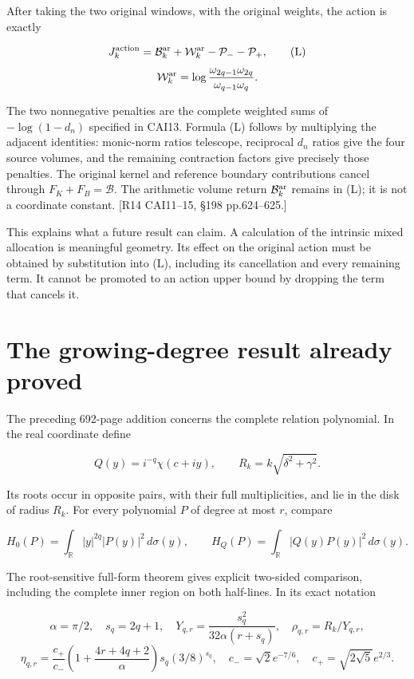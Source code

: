 After taking the two original windows, with the original weights, the action is exactly

\[
J_k^{\rm action}
=\mathcal B_k^{\rm ar}+\mathcal W_k^{\rm ar}
 -\mathcal P_- -\mathcal P_+,
\tag{L}
\] \[
\mathcal W_k^{\rm ar}
=\log\frac{\omega_{2q-1}\omega_{2q}}{\omega_{q-1}\omega_q}.
\]

The two nonnegative penalties are the complete weighted sums of \(-\log(1-d_n)\) specified in CAI13. Formula (L) follows by multiplying the adjacent identities: monic-norm ratios telescope, reciprocal \(d_n\) ratios give the four source volumes, and the remaining contraction factors give precisely those penalties. The original kernel and reference boundary contributions cancel through \(F_K+F_B=\mathcal B\). The arithmetic volume return \(\mathcal B_k^{\rm ar}\) remains in (L); it is not a coordinate constant. {[}R14 CAI11--15, §198 pp.624--625.{]}

This explains what a future result can claim. A calculation of the intrinsic mixed allocation is meaningful geometry. Its effect on the original action must be obtained by substitution into (L), including its cancellation and every remaining term. It cannot be promoted to an action upper bound by dropping the term that cancels it.

\section{The growing-degree result already proved}\label{the-growing-degree-result-already-proved}

The preceding 692-page addition concerns the complete relation polynomial. In the real coordinate define

\[
Q(y)=i^{-q}\chi(c+iy),\qquad R_k=k\sqrt{\delta^2+\gamma^2}.
\]

Its roots occur in opposite pairs, with their full multiplicities, and lie in the disk of radius \(R_k\). For every polynomial \(P\) of degree at most \(r\), compare

\[
H_0(P)=\int_{\mathbb R}|y|^{2q}|P(y)|^2\,d\sigma(y),\qquad
H_Q(P)=\int_{\mathbb R}|Q(y)P(y)|^2\,d\sigma(y).
\]

The root-sensitive full-form theorem gives explicit two-sided comparison, including the complete inner region on both half-lines. In its exact notation

\[
\alpha=\pi/2,\quad s_q=2q+1,\quad
Y_{q,r}=\frac{s_q^2}{32\alpha(r+s_q)},\quad
\rho_{q,r}=R_k/Y_{q,r},
\] \[
\eta_{q,r}=\frac{c_+}{c_-}
 \left(1+\frac{4r+4q+2}{\alpha}\right)s_q(3/8)^{s_q},
\quad c_-=\sqrt2e^{-7/6},\quad c_+=\sqrt{2\sqrt5}e^{2/3}.
\]

